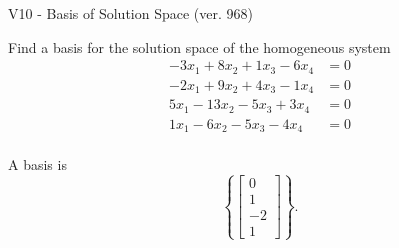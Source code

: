 \begin{exercise}
  \begin{exerciseTitle}V10 - Basis of Solution Space (ver. 968)\end{exerciseTitle}
  \begin{exerciseStatement}
    Find a basis for the solution space of the homogeneous system 
\begin{align*}
 -3 x_ 1 + 8 x_ 2 + 1 x_ 3 -6 x_ 4 &= 0  \\ 
  -2 x_ 1 + 9 x_ 2 + 4 x_ 3 -1 x_ 4 &= 0  \\ 
  5 x_ 1 -13 x_ 2 -5 x_ 3 + 3 x_ 4 &= 0  \\ 
  1 x_ 1 -6 x_ 2 -5 x_ 3 -4 x_ 4 &= 0  \\ 
 \end{align*}


 
  \end{exerciseStatement}

  \begin{exerciseAnswer}
   A basis is   
\[\left\{\left[\begin{array}{c}
0 \\
1 \\
-2 \\
1
\end{array}\right]\right\}.\]

  


  \end{exerciseAnswer}
\end{exercise}